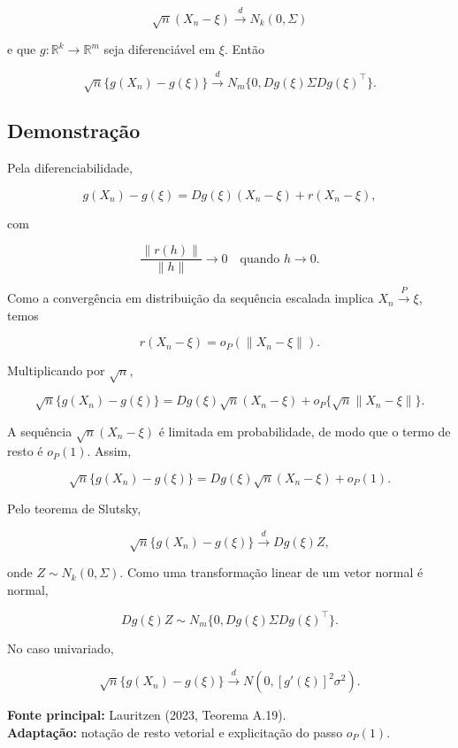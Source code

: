\documentclass[
  letterpaper,
  DIV=11,
  numbers=noendperiod]{scrreprt}
\begin{document}
\[
\sqrt n(X_n-\xi)\xrightarrow{d}N_k(0,\Sigma)
\]

e que \(g:\mathbb R^k\to\mathbb R^m\) seja diferenciável em \(\xi\).
Então

\[
\sqrt n\{g(X_n)-g(\xi)\}
\xrightarrow{d}
N_m\{0,Dg(\xi)\Sigma Dg(\xi)^\top\}.
\]

\subsection*{Demonstração}\label{demonstrauxe7uxe3o-14}

Pela diferenciabilidade,

\[
g(X_n)-g(\xi)
=
Dg(\xi)(X_n-\xi)+r(X_n-\xi),
\]

com

\[
\frac{\|r(h)\|}{\|h\|}\to 0
\quad\text{quando }h\to 0.
\]

Como a convergência em distribuição da sequência escalada implica
\(X_n\xrightarrow{P}\xi\), temos

\[
r(X_n-\xi)
=o_P(\|X_n-\xi\|).
\]

Multiplicando por \(\sqrt n\),

\[
\sqrt n\{g(X_n)-g(\xi)\}
=
Dg(\xi)\sqrt n(X_n-\xi)
+
o_P\{\sqrt n\|X_n-\xi\|\}.
\]

A sequência \(\sqrt n(X_n-\xi)\) é limitada em probabilidade, de modo
que o termo de resto é \(o_P(1)\). Assim,

\[
\sqrt n\{g(X_n)-g(\xi)\}
=
Dg(\xi)\sqrt n(X_n-\xi)+o_P(1).
\]

Pelo teorema de Slutsky,

\[
\sqrt n\{g(X_n)-g(\xi)\}
\xrightarrow{d}
Dg(\xi)Z,
\]

onde \(Z\sim N_k(0,\Sigma)\). Como uma transformação linear de um vetor
normal é normal,

\[
Dg(\xi)Z
\sim
N_m\{0,Dg(\xi)\Sigma Dg(\xi)^\top\}.
\]

No caso univariado,

\[
\sqrt n\{g(X_n)-g(\xi)\}
\xrightarrow{d}
N\left(0,[g'(\xi)]^2\sigma^2\right).
\]

\begin{tcolorbox}[enhanced jigsaw, colback=white, leftrule=.75mm, colbacktitle=quarto-callout-note-color!10!white, breakable, titlerule=0mm, bottomtitle=1mm, title=\textcolor{quarto-callout-note-color}{\faInfo}\hspace{0.5em}{Fonte da demonstração}, colframe=quarto-callout-note-color-frame, toprule=.15mm, opacityback=0, bottomrule=.15mm, opacitybacktitle=0.6, arc=.35mm, toptitle=1mm, rightrule=.15mm, coltitle=black, left=2mm]

\textbf{Fonte principal:} Lauritzen (2023, Teorema A.19).\\
\textbf{Adaptação:} notação de resto vetorial e explicitação do passo
\(o_P(1)\).

\end{tcolorbox}
\end{document}
